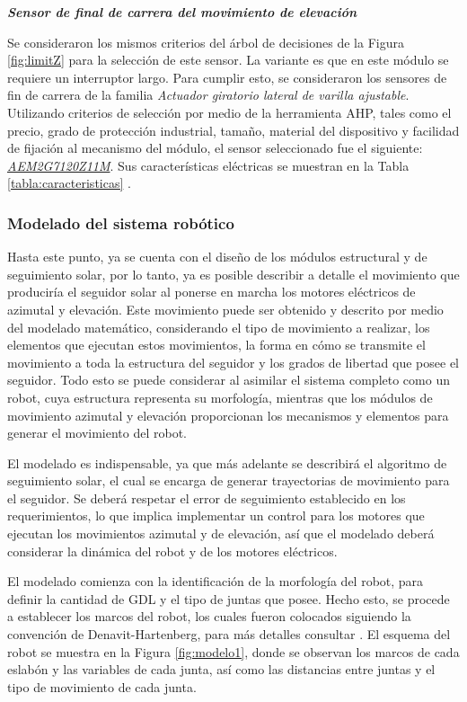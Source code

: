 \textbf{\textit{Sensor de final de carrera del movimiento de elevación}}

Se consideraron los mismos criterios del árbol de decisiones de la Figura \ref{fig:limitZ} para la selección de este sensor. La variante es que en este módulo se requiere un interruptor largo. Para cumplir esto, se consideraron los sensores de fin de carrera de la familia \textit{Actuador giratorio lateral de varilla ajustable}. Utilizando criterios de selección por medio de la herramienta AHP, tales como el precio, grado de protección industrial, tamaño, material del dispositivo y facilidad de fijación al mecanismo del módulo, el sensor seleccionado fue el siguiente: \underline{\textit{AEM2G7120Z11M}}. Sus características eléctricas se muestran en la Tabla \ref{tabla:caracteristicas} \cite{DDA8}.

\subsubsection{Modelado del sistema robótico}
Hasta este punto, ya se cuenta con el diseño de los módulos estructural y de seguimiento solar, por lo tanto, ya es posible describir a detalle el movimiento que produciría el seguidor solar al ponerse en marcha los motores eléctricos de azimutal y elevación. Este movimiento puede ser obtenido y descrito por medio del modelado matemático, considerando el tipo de movimiento a realizar, los elementos que ejecutan estos movimientos, la forma en cómo se transmite el movimiento a toda la estructura del seguidor y los grados de libertad que posee el seguidor. Todo esto se puede considerar al asimilar el sistema completo como un robot, cuya estructura representa su morfología, mientras que los módulos de movimiento azimutal y elevación proporcionan los mecanismos y elementos para generar el movimiento del robot.

El modelado es indispensable, ya que más adelante se describirá el algoritmo de seguimiento solar, el cual se encarga de generar trayectorias de movimiento para el seguidor. Se deberá respetar el error de seguimiento establecido en los requerimientos, lo que implica implementar un control para los motores que ejecutan los movimientos azimutal y de elevación, así que el modelado deberá considerar la dinámica del robot y de los motores eléctricos.

El modelado comienza con la identificación de la morfología del robot, para definir la cantidad de GDL y el tipo de juntas que posee. Hecho esto, se procede a establecer los marcos del robot, los cuales fueron colocados siguiendo la convención de Denavit-Hartenberg, para más detalles consultar \cite{DDA11}. El esquema del robot se muestra en la Figura \ref{fig:modelo1}, donde se observan los marcos de cada eslabón y las variables de cada junta, así como las distancias entre juntas y el tipo de movimiento de cada junta.


